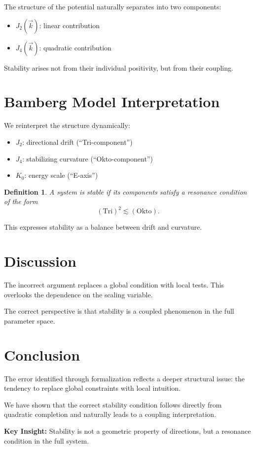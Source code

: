 \documentclass[11pt,a4paper]{article}
\newtheorem{definition}{Definition}[section]
\begin{document}
	The structure of the potential naturally separates into two components:
	\begin{itemize}
		\item $J_2(\vec{k})$: linear contribution
		\item $J_4(\vec{k})$: quadratic contribution
	\end{itemize}
	
	Stability arises not from their individual positivity, but from their coupling.
	
	\section{Bamberg Model Interpretation}
	
	We reinterpret the structure dynamically:
	
	\begin{itemize}
		\item $J_2$: directional drift (``Tri-component'')
		\item $J_4$: stabilizing curvature (``Okto-component'')
		\item $K_0$: energy scale (``E-axis'')
	\end{itemize}
	
	\begin{definition}
		A system is stable if its components satisfy a resonance condition of the form
		\[
		(\text{Tri})^2 \lesssim (\text{Okto}).
		\]
	\end{definition}
	
	This expresses stability as a balance between drift and curvature.
	
	\section{Discussion}
	
	The incorrect argument replaces a global condition with local tests. This overlooks the dependence on the scaling variable.
	
	The correct perspective is that stability is a coupled phenomenon in the full parameter space.
	
	\section{Conclusion}
	
	The error identified through formalization reflects a deeper structural issue: the tendency to replace global constraints with local intuition.
	
	We have shown that the correct stability condition follows directly from quadratic completion and naturally leads to a coupling interpretation.
	
	\bigskip
	
	\noindent
	\textbf{Key Insight:} Stability is not a geometric property of directions, but a resonance condition in the full system.
	
\end{document}
